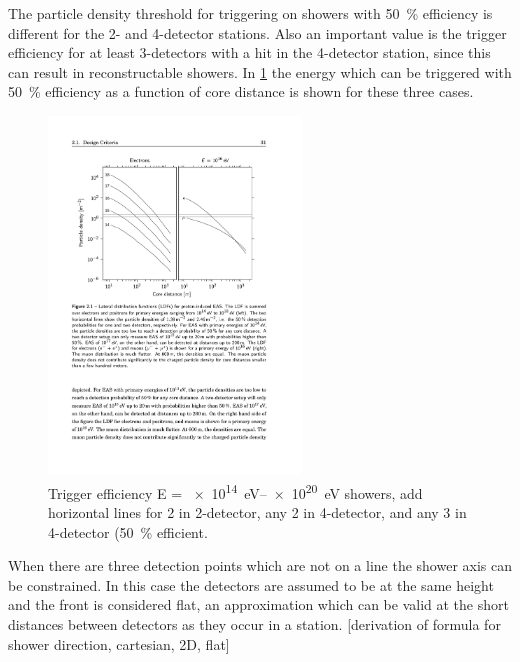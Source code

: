 The particle density threshold for triggering on showers with \SI{50}{\percent} efficiency is different for the 2- and 4-detector stations. Also an important value is the trigger efficiency for at least 3-detectors with a hit in the 4-detector station, since this can result in reconstructable showers. In \cref{fig:ldf_energies2} the energy which can be triggered with \SI{50}{\percent} efficiency as a function of core distance is shown for these three cases.

\begin{figure}
    \centering
    \includegraphics[width=0.6\textwidth]
                    {plots/experiment/ldf_energies}
    \caption{Trigger efficiency E = \SIrange{e14}{e20}{\eV} showers, add horizontal lines for 2 in 2-detector, any 2 in 4-detector, and any 3 in 4-detector (\SI{50}{\percent} efficient.}
    \label{fig:ldf_energies2}
\end{figure}

When there are three detection points which are not on a line the shower axis can be constrained. In this case the detectors are assumed to be at the same height and the front is considered flat, an approximation which can be valid at the short distances between detectors as they occur in a station.
[derivation of formula for shower direction, cartesian, 2D, flat]

